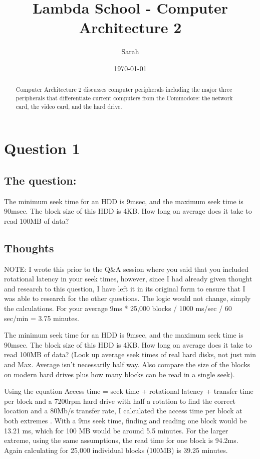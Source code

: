 \documentclass[a4paper]{article}
\title{Lambda School - Computer Architecture 2}
\author{Sarah}
\date{\today}
\begin{document}
\maketitle

\begin{abstract}
Computer Architecture 2 discusses computer peripherals including the major three peripherals that differentiate current computers from the Commodore: the network card, the video card, and the hard drive.
\end{abstract}

\section{Question 1}
\label{sec:question 1}
\subsection{The question:}
The minimum seek time for an HDD is 9msec, and the maximum seek time is 90msec. The block size of this HDD is 4KB. How long on average does it take to read 100MB of data?

\subsection{Thoughts}

    NOTE: I wrote this prior to the Q\&A session where you said that you included rotational latency in your seek times, however, since I had already given thought and research to this question, I have left it in its original form to ensure that I was able to research for the other questions.  The logic would not change, simply the calculations.  For your average 9ms * 25,000 blocks / 1000 ms/sec / 60 sec/min = 3.75 minutes.

    The minimum seek time for an HDD is 9msec, and the maximum seek time is 90msec. The block size of this HDD is 4KB. How long on average does it take to read 100MB of data?  (Look up average seek times of real hard disks, not just min and Max. Average isn't necessarily half way. Also compare the size of the blocks on modern hard drives plus how many blocks can be read in a single seek).

	Using the equation Access time = seek time + rotational latency + transfer time per block and a 7200rpm hard drive with half a rotation to find the correct location and a 80Mb/s transfer rate, I calculated the access time per block at both extremes \cite{stack1}.  With a 9ms seek time, finding and reading one block would be 13.21 ms, which for 100 MB would be around 5.5 minutes.  For the larger extreme, using the same assumptions, the read time for one block is 94.2ms.  Again calculating for 25,000 individual blocks (100MB) is 39.25 minutes.  
\end{document}
